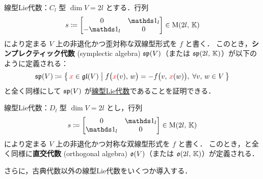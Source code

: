 \documentclass[rep_main]{subfiles}
\begin{document}
\begin{myexample}[label=def:typeC]{線型Lie代数：$C_l$ 型}
    $\dim V = 2l$ とする．行列
    \begin{align}
        s \coloneqq \mqty[
            0 & \unity_l \\
            -\unity_l & 0
        ] \in \Mat{2l}{\mathbb{K}}
    \end{align}
    により定まる $V$ 上の非退化かつ歪対称な双線型形式を $f$ と書く．
    このとき，\textbf{シンプレクティック代数} (symplectic algebra) $\mathfrak{sp} (V)$（または $\mathfrak{sp}(2l,\, \mathbb{K})$）が以下のように定義される：
    \begin{align}
        \mathfrak{sp} (V) \coloneqq \bigl\{\, \textcolor{red}{x} \in \mathfrak{gl} (V) \bigm| f \bigl( \textcolor{red}{x}(v),\, w \bigr) = -f \bigl( v,\, \textcolor{red}{x}(w) \bigr),\; \forall v,\, w \in V \,\bigr\} 
    \end{align}
    と全く同様にして $\mathfrak{sp} (V)$ が\hyperref[def:linearLieAlg]{線型Lie代数}であることを証明できる．
\end{myexample}

\begin{myexample}[label=def:typeD]{線型Lie代数：$D_l$ 型}
    $\dim V = 2l$ とし，行列
    \begin{align}
        s \coloneqq \mqty[
            0 & \unity_l \\
            \unity_l & 0
        ] \in \Mat{2l}{\mathbb{K}}
    \end{align}
    により定まる $V$ 上の非退化かつ対称な双線型形式を $f$ と書く．
    このとき，と全く同様に\textbf{直交代数} (orthogonal algebra) $\mathfrak{o} (V)$（または $\mathfrak{o}(2l,\, \mathbb{K})$）が定義される．
\end{myexample}

さらに，古典代数以外の線型Lie代数をいくつか導入する．
\end{document}
